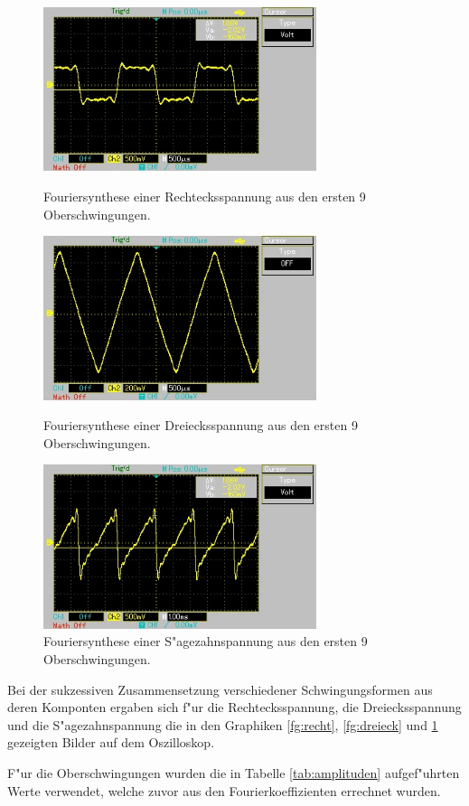 \begin{figure}[!h]
	\centering
	\includegraphics[width = 8cm]{img/rechteck.jpg}
	\caption{Fouriersynthese einer Rechtecksspannung aus den ersten 9 Oberschwingungen.}
	\label{fg:recht}

	\includegraphics[width = 8cm]{img/dreieck.jpg}
	\caption{Fouriersynthese einer Dreiecksspannung aus den ersten 9 Oberschwingungen.}
	\label{fg:dreieck}

	\includegraphics[width = 8cm]{img/saege.jpg}
	\caption{Fouriersynthese einer S"agezahnspannung aus den ersten 9 Oberschwingungen.}
	\label{fg:saege}
\end{figure}
\clearpage


Bei der sukzessiven Zusammensetzung verschiedener Schwingungsformen aus deren Komponten ergaben sich f"ur die Rechtecksspannung, die Dreiecksspannung und die S"agezahnspannung die in den Graphiken \ref{fg:recht}, \ref{fg:dreieck} und \ref{fg:saege} gezeigten Bilder auf dem Oszilloskop.

F"ur die Oberschwingungen wurden die in Tabelle \ref{tab:amplituden} aufgef"uhrten Werte verwendet, welche zuvor aus den Fourierkoeffizienten errechnet wurden.